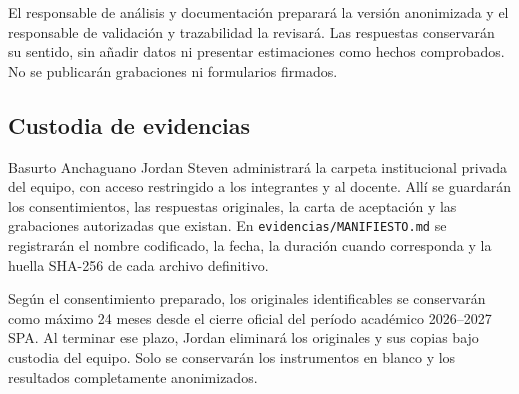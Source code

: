 El responsable de análisis y documentación preparará la versión anonimizada y el responsable de validación y trazabilidad la revisará. Las respuestas conservarán su sentido, sin añadir datos ni presentar estimaciones como hechos comprobados. No se publicarán grabaciones ni formularios firmados.

\subsection{Custodia de evidencias}

Basurto Anchaguano Jordan Steven administrará la carpeta institucional privada del equipo, con acceso restringido a los integrantes y al docente. Allí se guardarán los consentimientos, las respuestas originales, la carta de aceptación y las grabaciones autorizadas que existan. En \texttt{evidencias/MANIFIESTO.md} se registrarán el nombre codificado, la fecha, la duración cuando corresponda y la huella SHA-256 de cada archivo definitivo.

Según el consentimiento preparado, los originales identificables se conservarán como máximo 24 meses desde el cierre oficial del período académico 2026--2027 SPA. Al terminar ese plazo, Jordan eliminará los originales y sus copias bajo custodia del equipo. Solo se conservarán los instrumentos en blanco y los resultados completamente anonimizados.
